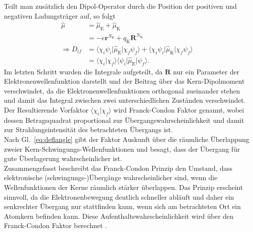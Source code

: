 Teilt man zusätzlich den Dipol-Operator durch die Position der positiven und negativen Ladungsträger auf, 
so folgt 
\begin{align}
    \hat{\mu} &= \hat{\mu}_{\text{E}} + \hat{\mu}_{\text{K}} \\
    &= -e\mathbf{r}^{N_{\text{E}}} + q_{\text{K}}\mathbf{R}^{N_{\text{K}}} \\
    \Rightarrow D_{if} &= \langle\chi_{i}\psi_{i}\vert \hat{\mu}_{\text{E}} \vert\chi_{f}\psi_{f}\rangle + 
    \langle\chi_{i}\psi_{i}\vert \hat{\mu}_{\text{K}} \vert\chi_{f}\psi_{f}\rangle \\
    &= \langle\chi_{i}\vert \chi_{f}\rangle \langle \psi_{i}\vert \hat{\mu}_{\text{E}}\vert\psi_{f}\rangle.
\end{align} 
Im letzten Schritt wurden die Integrale aufgeteilt, da $\mathbf{R}$ nur ein Parameter der Elektronenwellenfunktion 
darstellt und der Beitrag über das Kern-Dipolmoment verschwindet, da die Elektronenwellenfunktionen
orthogonal zueinander stehen und damit das Integral zwischen zwei unterschiedlichen Zuständen verschwindet. \\
Der Resultierende Vorfaktor $\langle\chi_{i}\vert \chi_{f}\rangle$ wird Franck-Condon Faktor genannt, 
wobei dessen Betragsquadrat proportional zur Übergangswahrscheinlichkeit und damit zur Strahlungsintensität 
des betrachteten Übergangs ist. \\
Nach Gl.~\eqref{eq:deflangle} gibt der Faktor Auskunft über die räumliche Überlappung zweier Kern-Schwingungs-Wellenfunktionen
und besagt, dass der Übergang für gute Überlagerung wahrscheinlicher ist. \\ 
Zusammengefasst beschreibt das Franck-Condon Prinzip den Umstand, dass elektronische (schwingungs-)Übergänge 
wahrscheinlicher sind, wenn die Wellenfunktionen der Kerne räumlich stärker überlappen. Das Prinzip erscheint sinnvoll, 
da die Elektronenbewegung deutlich schneller abläuft und daher ein senkrechter Übergang nur stattfinden kann, 
wenn sich am betrachteten Ort ein Atomkern befinden kann. Diese Aufenthaltswahrscheinlichkeit wird über den 
Franck-Condon Faktor berechnet \cite{EPC,Demtroder,Parson}. \\ 